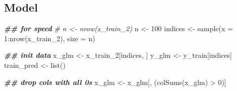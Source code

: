 \documentclass[
]{book}
\newenvironment{Shaded}{\begin{snugshade}}{\end{snugshade}}
\newcommand{\AttributeTok}[1]{\textcolor[rgb]{0.77,0.63,0.00}{#1}}
\newcommand{\CommentTok}[1]{\textcolor[rgb]{0.56,0.35,0.01}{\textit{#1}}}
\newcommand{\ControlFlowTok}[1]{\textcolor[rgb]{0.13,0.29,0.53}{\textbf{#1}}}
\newcommand{\DecValTok}[1]{\textcolor[rgb]{0.00,0.00,0.81}{#1}}
\newcommand{\DocumentationTok}[1]{\textcolor[rgb]{0.56,0.35,0.01}{\textbf{\textit{#1}}}}
\newcommand{\FunctionTok}[1]{\textcolor[rgb]{0.00,0.00,0.00}{#1}}
\newcommand{\NormalTok}[1]{#1}
\newcommand{\OtherTok}[1]{\textcolor[rgb]{0.56,0.35,0.01}{#1}}
\newcommand{\SpecialCharTok}[1]{\textcolor[rgb]{0.00,0.00,0.00}{#1}}
\newcommand{\StringTok}[1]{\textcolor[rgb]{0.31,0.60,0.02}{#1}}
\begin{document}
\hypertarget{model}{%
\subsection{Model}\label{model}}

\begin{Shaded}
\begin{Highlighting}[]
\DocumentationTok{\#\# for speed}
\CommentTok{\# n \textless{}{-} nrow(x\_train\_2)}
\NormalTok{n }\OtherTok{\textless{}{-}} \DecValTok{100}
\NormalTok{indices }\OtherTok{\textless{}{-}} \FunctionTok{sample}\NormalTok{(}\AttributeTok{x =} \DecValTok{1}\SpecialCharTok{:}\FunctionTok{nrow}\NormalTok{(x\_train\_2),}
                  \AttributeTok{size =}\NormalTok{ n)}

\DocumentationTok{\#\# init data}
\NormalTok{x\_glm }\OtherTok{\textless{}{-}}\NormalTok{ x\_train\_2[indices, ]}
\NormalTok{y\_glm }\OtherTok{\textless{}{-}}\NormalTok{ y\_train[indices]}
\NormalTok{train\_pred }\OtherTok{\textless{}{-}} \FunctionTok{list}\NormalTok{()}

\DocumentationTok{\#\# drop cols with all 0s}
\NormalTok{x\_glm }\OtherTok{\textless{}{-}}\NormalTok{ x\_glm[, (}\FunctionTok{colSums}\NormalTok{(x\_glm) }\SpecialCharTok{\textgreater{}} \DecValTok{0}\NormalTok{)]}
\end{Highlighting}
\end{Shaded}

\begin{Shaded}
\end{Shaded}
\end{document}
